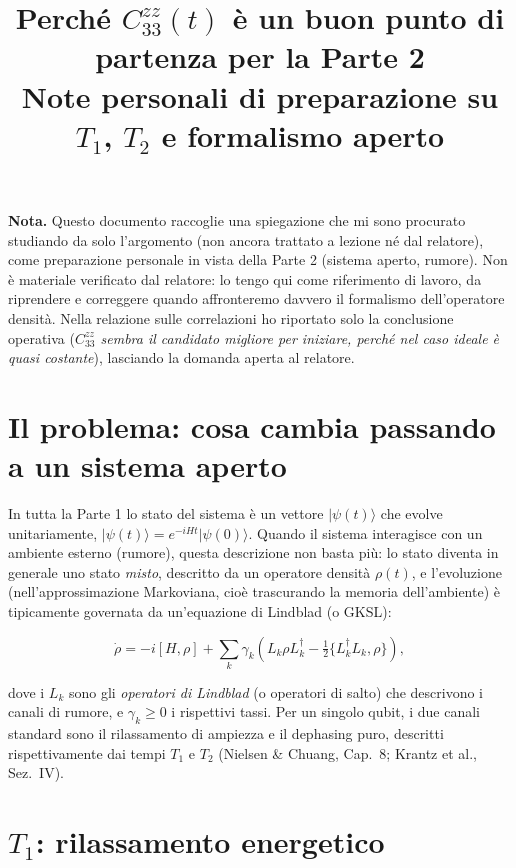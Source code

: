 \documentclass[11pt,a4paper]{article}
\title{Perché $C_{33}^{zz}(t)$ è un buon punto di partenza per la Parte 2\\
\large Note personali di preparazione su $T_1$, $T_2$ e formalismo aperto}
\author{}
\date{}
\newcommand{\ket}[1]{\lvert #1 \rangle}
\begin{document}
\maketitle

\noindent\textbf{Nota.} Questo documento raccoglie una spiegazione che mi sono procurato studiando da solo l'argomento (non ancora trattato a lezione né dal relatore), come preparazione personale in vista della Parte 2 (sistema aperto, rumore). Non è materiale verificato dal relatore: lo tengo qui come riferimento di lavoro, da riprendere e correggere quando affronteremo davvero il formalismo dell'operatore densità. Nella relazione sulle correlazioni ho riportato solo la conclusione operativa (\emph{$C_{33}^{zz}$ sembra il candidato migliore per iniziare, perché nel caso ideale è quasi costante}), lasciando la domanda aperta al relatore.

\tableofcontents

\section{Il problema: cosa cambia passando a un sistema aperto}

In tutta la Parte 1 lo stato del sistema è un vettore $\ket{\psi(t)}$ che evolve unitariamente, $\ket{\psi(t)}=e^{-iHt}\ket{\psi(0)}$. Quando il sistema interagisce con un ambiente esterno (rumore), questa descrizione non basta più: lo stato diventa in generale uno stato \emph{misto}, descritto da un operatore densità $\rho(t)$, e l'evoluzione (nell'approssimazione Markoviana, cioè trascurando la memoria dell'ambiente) è tipicamente governata da un'equazione di Lindblad (o GKSL):

\begin{equation}
\dot\rho = -i[H,\rho] + \sum_k \gamma_k\left(L_k\rho L_k^\dagger - \tfrac12\{L_k^\dagger L_k,\rho\}\right),
\end{equation}

dove i $L_k$ sono gli \emph{operatori di Lindblad} (o operatori di salto) che descrivono i canali di rumore, e $\gamma_k\ge0$ i rispettivi tassi. Per un singolo qubit, i due canali standard sono il rilassamento di ampiezza e il dephasing puro, descritti rispettivamente dai tempi $T_1$ e $T_2$ (Nielsen \& Chuang, Cap.~8; Krantz et al., Sez.~IV).

\section{$T_1$: rilassamento energetico}
\end{document}
